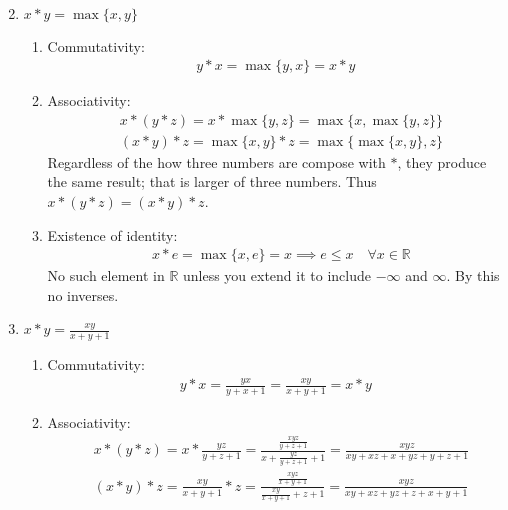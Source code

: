 \documentclass[nohyper,nobib]{tufte-handout}
\theoremstyle{definition}
\theoremstyle{remark}
\begin{document}
\begin{enumerate}
\begin{enumerate}[i]
\begin{align}
                \end{align}
        \end{enumerate}
    \item $x * y = \max{\{x, y}\}$
        \begin{enumerate}[I]
            \item Commutativity:
                \begin{align}
                    y * x = \max{\{y, x\}} = x * y
                \end{align}
            \item Associativity:
                \begin{align}
                    &x * (y * z) = x * \max{\{y, z\}} = \max{\{x, \max{\{y, z\}} \}} \nonumber \\
                    &(x * y) * z = \max{\{x, y\}} * z = \max{\{\max{\{x, y\}}, z \}}
                \end{align}
                Regardless of the how three numbers are compose with $*$, they produce the same result; that is larger of three numbers. Thus $x * (y * z) = (x * y) * z$.
            \item Existence of identity:
                \begin{align}
                    &x * e = \max{\{x, e\}} = x \implies e \leq x \quad\forall x \in \mathbb{R}
                \end{align}
                No such element in $\mathbb{R}$ unless you extend it to include $-\infty$ and $\infty$. By this no inverses.
        \end{enumerate}
    \item $x * y = \frac{xy}{x + y + 1}$
        \begin{enumerate}[i]
            \item Commutativity:
                \begin{align}
                    y * x = \frac{yx}{y + x + 1} = \frac{xy}{x + y + 1} = x * y
                \end{align}
            \item Associativity:
                \begin{align}
                    &x * (y * z) = x * \frac{yz}{y + z + 1} =\frac{\frac{xyz}{y + z + 1}}{x + \frac{yz}{y + z + 1} + 1} = \frac{xyz}{xy + xz + x + yz + y + z + 1} \nonumber \\
                    &(x * y) * z = \frac{xy}{x + y + 1} * z = \frac{\frac{xyz}{x + y + 1}}{\frac{xy}{x + y + 1} + z + 1} = \frac{xyz}{xy + xz + yz + z + x + y +1 }

\end{align}
\end{enumerate}
\end{enumerate}
\end{document}
